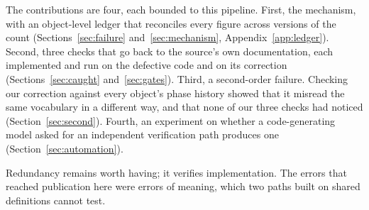 The contributions are four, each bounded to this pipeline.
First, the mechanism, with an object-level ledger that reconciles every figure
across versions of the count (Sections~\ref{sec:failure}
and~\ref{sec:mechanism}, Appendix~\ref{app:ledger}).
Second, three checks that go back to the source's own documentation, each
implemented and run on the defective code and on its correction
(Sections~\ref{sec:caught} and~\ref{sec:gates}).
Third, a second-order failure. Checking our correction against every object's
phase history showed that it misread the same vocabulary in a different way, and that
none of our three checks had noticed (Section~\ref{sec:second}).
Fourth, an experiment on whether a code-generating model asked for an
independent verification path produces one (Section~\ref{sec:automation}).

Redundancy remains worth having; it verifies implementation. The errors that
reached publication here were errors of meaning, which two paths built on shared
definitions cannot test.
